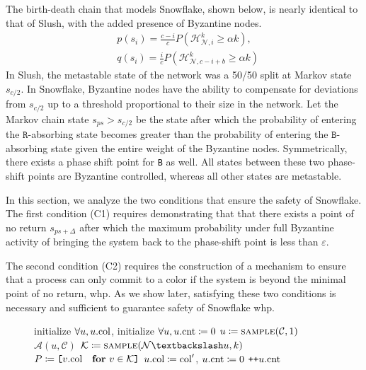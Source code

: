 \documentclass[letterpaper,twocolumn,10pt]{article}
\theoremstyle{definition}
\begin{document}
\begin{appendices}
The birth-death chain that models Snowflake, shown below, is nearly identical to that of Slush, with the added presence of Byzantine nodes. 
\begin{equation*}
\begin{split}
&p(s_i)=\frac{c-i}{c}P(\mathcal{H}_{\mathcal{N}, i}^{k} \geq \alpha k),\\
&q(s_i)=\frac{i}{c}P(\mathcal{H}_{\mathcal{N}, c-i+b}^{k} \geq \alpha k)
\end{split}
\end{equation*}
In Slush, the metastable state of the network was a 50/50 split at Markov state $s_{c/2}$. 
In Snowflake, Byzantine nodes have the ability to compensate for deviations from $s_{c/2}$ up to a threshold proportional to their size in the network.
Let the Markov chain state $s_{ps} > s_{c/2}$ be the state after which the probability of entering the $\mathtt{R}$-absorbing state becomes greater than the probability of entering the $\mathtt{B}$-absorbing state given the entire weight of the Byzantine nodes. 
Symmetrically, there exists a phase shift point for \texttt{B} as well. 
All states between these two phase-shift points are Byzantine controlled, whereas all other states are metastable.

In this section, we analyze the two conditions that ensure the safety of Snowflake. The first condition (C1) requires demonstrating that that there exists a point of no return $s_{ps + \Delta}$ after which
the maximum probability under full Byzantine activity of bringing the system back to the phase-shift point is less than $\varepsilon$. 

The second condition (C2) requires the construction of a mechanism to ensure that a process can only commit to a color if the system is beyond the minimal point of no return, whp. 
As we show later, satisfying these two conditions is necessary and sufficient to guarantee safety of Snowflake whp. 


\begin{figure}
\begin{algorithmic}[1]
    \State initialize $\forall u, u.\textrm{col}$,
    \State initialize $\forall u, u.\textrm{cnt} \coloneqq 0$
    \State $u \coloneqq \Call{sample}{\mathcal{C}, 1}$
    \State $\mathcal{A}(u, \mathcal{C})$
    \State $\mathcal{K} \coloneqq \Call{sample}{\mathcal{N}\textbackslash u, k}$
    \State $P \coloneqq \texttt{[}v.\textrm{col}\quad\textbf{for}\ v \in \mathcal{K}\texttt{]}$
            \State $u.\textrm{col} \coloneqq \textrm{col}'$, $u.\textrm{cnt} \coloneqq 0$
        \Else
            \State $\texttt{++}u.\textrm{cnt}$
        \EndIf
    \EndIf
    \EndFor
\EndFor
{}\label{fig:snowflake_simulator}
\end{algorithmic}
\end{figure}


\end{appendices}
\end{document}
